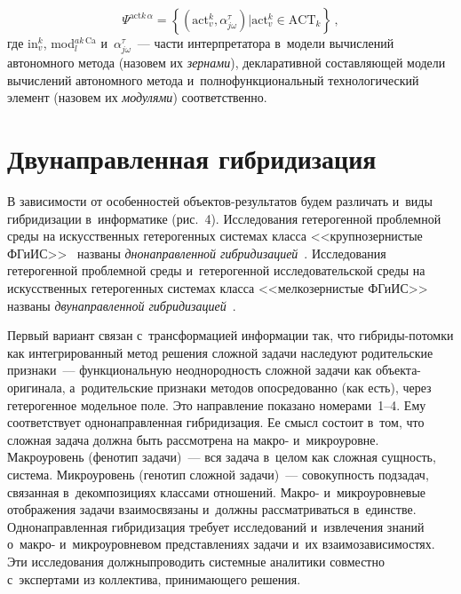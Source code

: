 \begin{multicols}{2}
\noindent
$$
  \Psi^{\mathrm{act}k\,\alpha}= \left\{ \left( \mathrm{act}_v^k, \alpha^\tau_{j\omega}\right) \vert 
\mathrm{act}_v^k\in \mathrm{ACT}_k\right\}\,,
  $$
    где in$_v^k$, mod$_l^{ak\,\mathrm{Ca}}$ и~$\alpha_{j\omega}^\tau$~--- 
    части интерпретатора в~модели 
вычислений автономного метода (назовем их \textit{зернами}), декларативной составляющей 
модели вычислений автономного метода и~полнофункциональный технологический элемент 
(назовем их \textit{модулями}) соответственно. 

\vspace*{-6pt}

\section{Двунаправленная гибридизация } %

  В зависимости от особенностей объектов-ре\-зуль\-та\-тов будем различать и~виды 
гибридизации в~информатике (рис.~4). Исследования гетерогенной проблемной среды на 
искусственных гетерогенных системах класса <<крупнозернистые  
\mbox{ФГиИС}>>~\cite{11-kir, 17-kir} названы \textit{днонаправленной гибридизацией}~\cite{8-kir}. 
Исследования гетерогенной проблемной среды и~гетерогенной исследовательской среды на 
искусственных гетерогенных системах класса <<мелкозернистые  
\mbox{ФГиИС}>>~\cite{8-kir, 11-kir, 17-kir} названы \textit{дву\-на\-прав\-лен\-ной 
гибридизацией}~\cite{8-kir}. 



  Первый вариант связан с~трансформацией информации так, что гиб\-ри\-ды-по\-том\-ки 
как интегрированный метод решения сложной задачи наследуют родительские признаки~--- 
функциональную неоднородность сложной задачи как объ\-ек\-та-ори\-ги\-на\-ла, 
а~родительские признаки методов опосредованно (как есть), через гетерогенное модельное 
поле. Это направление показано номерами~1--4. Ему соответствует однонаправленная 
гибридизация. Ее смысл состоит в~том, что сложная задача должна быть рассмотрена на 
макро- и~микроуровне. Макроуровень (фенотип задачи)~--- вся задача в~целом как сложная 
сущность, система. Микроуровень (генотип сложной задачи)~--- совокупность подзадач, 
связанная в~декомпозициях классами отношений. Макро- и~микроуровневые отображения 
задачи взаимосвязаны и~должны рассматриваться\linebreak
 в~единстве. Однонаправленная 
гибридизация требует исследований и~извлечения знаний о~макро- и~микроуровневом 
представлениях задачи и~их взаимозависимостях. Эти исследования должны\linebreak проводить 
системные аналитики совместно с~экспертами из коллектива, принимающего решения. 


\end{multicols}
